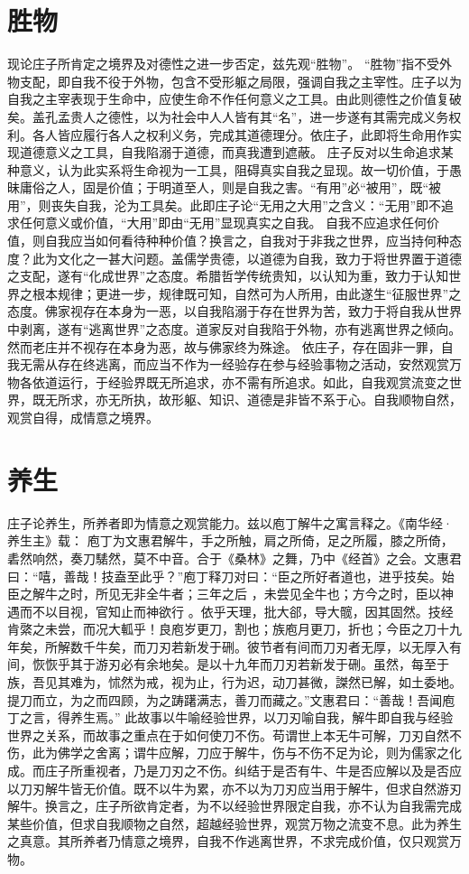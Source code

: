 \documentclass[11pt]{article}
\begin{document}
\section{胜物}
现论庄子所肯定之境界及对德性之进一步否定，兹先观“胜物”。
“胜物”指不受外物支配，即自我不役于外物，包含不受形躯之局限，强调自我之主宰性。庄子以为自我之主宰表现于生命中，应使生命不作任何意义之工具。由此则德性之价值复破矣。盖孔孟贵人之德性，以为社会中人人皆有其“名”，进一步遂有其需完成义务权利。各人皆应履行各人之权利义务，完成其道德理分。依庄子，此即将生命用作实现道德意义之工具，自我陷溺于道德，而真我遭到遮蔽。
庄子反对以生命追求某种意义，认为此实系将生命视为一工具，阻碍真实自我之显现。故一切价值，于愚昧庸俗之人，固是价值；于明道至人，则是自我之害。“有用”必“被用”，既“被用”，则丧失自我，沦为工具矣。此即庄子论“无用之大用”之含义：“无用”即不追求任何意义或价值，“大用”即由“无用”显现真实之自我。
自我不应追求任何价值，则自我应当如何看待种种价值？换言之，自我对于非我之世界，应当持何种态度？此为文化之一甚大问题。盖儒学贵德，以道德为自我，致力于将世界置于道德之支配，遂有“化成世界”之态度。希腊哲学传统贵知，以认知为重，致力于认知世界之根本规律；更进一步，规律既可知，自然可为人所用，由此遂生“征服世界”之态度。佛家视存在本身为一恶，以自我陷溺于存在世界为苦，致力于将自我从世界中剥离，遂有“逃离世界”之态度。道家反对自我陷于外物，亦有逃离世界之倾向。然而老庄并不视存在本身为恶，故与佛家终为殊途。
依庄子，存在固非一罪，自我无需从存在终逃离，而应当不作为一经验存在参与经验事物之活动，安然观赏万物各依道运行，于经验界既无所追求，亦不需有所追求。如此，自我观赏流变之世界，既无所求，亦无所执，故形躯、知识、道德是非皆不系于心。自我顺物自然，观赏自得，成情意之境界。

\section{养生}
庄子论养生，所养者即为情意之观赏能力。兹以庖丁解牛之寓言释之。《南华经·养生主》载：
庖丁为文惠君解牛，手之所触，肩之所倚，足之所履，膝之所倚，砉然响然，奏刀騞然，莫不中音。合于《桑林》之舞，乃中《经首》之会。文惠君曰：“嘻，善哉！技盍至此乎？”庖丁释刀对曰：“臣之所好者道也，进乎技矣。始臣之解牛之时，所见无非全牛者；三年之后 ，未尝见全牛也；方今之时，臣以神遇而不以目视，官知止而神欲行 。依乎天理，批大郤，导大髋，因其固然。技经肯綮之未尝，而况大軱乎！良庖岁更刀，割也；族庖月更刀，折也；今臣之刀十九年矣，所解数千牛矣，而刀刃若新发于硎。彼节者有间而刀刃者无厚，以无厚入有间，恢恢乎其于游刃必有余地矣。是以十九年而刀刃若新发于硎。虽然，每至于族，吾见其难为，怵然为戒，视为止，行为迟，动刀甚微，謋然已解，如土委地。提刀而立，为之而四顾，为之踌躇满志，善刀而藏之。”文惠君曰：“善哉！吾闻庖丁之言，得养生焉。”
此故事以牛喻经验世界，以刀刃喻自我，解牛即自我与经验世界之关系，而故事之重点在于如何使刀不伤。苟谓世上本无牛可解，刀刃自然不伤，此为佛学之舍离；谓牛应解，刀应于解牛，伤与不伤不足为论，则为儒家之化成。而庄子所重视者，乃是刀刃之不伤。纠结于是否有牛、牛是否应解以及是否应以刀刃解牛皆无价值。既不以牛为累，亦不以为刀刃应当用于解牛，但求自然游刃解牛。换言之，庄子所欲肯定者，为不以经验世界限定自我，亦不认为自我需完成某些价值，但求自我顺物之自然，超越经验世界，观赏万物之流变不息。此为养生之真意。其所养者乃情意之境界，自我不作逃离世界，不求完成价值，仅只观赏万物。
\end{document}
